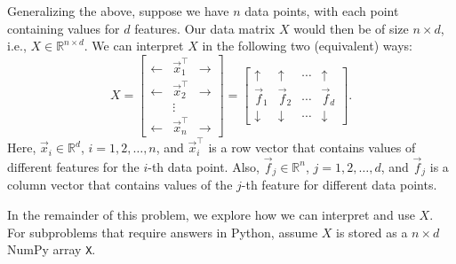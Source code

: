 \documentclass[10pt]{article}
\theoremstyle{definition}
\theoremstyle{plain}
\newcommand{\RR}{\mathbb{R}}
\begin{document}
Generalizing the above, suppose we have $n$ data points, with each point containing values for $d$ features. Our data matrix $X$ would then be of size $n \times d$, i.e., $X \in \RR^{n \times d}$. We can interpret $X$ in the following two (equivalent) ways:
\begin{equation}
X = \begin{bmatrix} \leftarrow & \vec{x}_1^\top & \rightarrow \\ \leftarrow & \vec{x}_2^\top & \rightarrow \\ & \vdots & \\ \leftarrow & \vec{x}_n^\top & \rightarrow \end{bmatrix} = \begin{bmatrix} \uparrow & \uparrow & \cdots & \uparrow \\ \vec{f}_1 & \vec{f}_2 & \cdots & \vec{f}_d \\ \downarrow & \downarrow & \cdots & \downarrow \end{bmatrix}.
\end{equation}
Here, $\vec{x}_i \in \RR^d$, $i = 1, 2, \ldots, n$, and $\vec{x}_i^\top$ is a row vector that contains values of different features for the $i$-th data point. Also, $\vec{f}_j \in \RR^n$, $j = 1, 2, \ldots, d$, and $\vec{f}_j$ is a column vector that contains values of the $j$-th feature for different data points.

In the remainder of this problem, we explore how we can interpret and use $X$. For subproblems that require answers in Python, assume $X$ is stored as a $n \times d$ NumPy array \texttt{X}.
\end{document}
